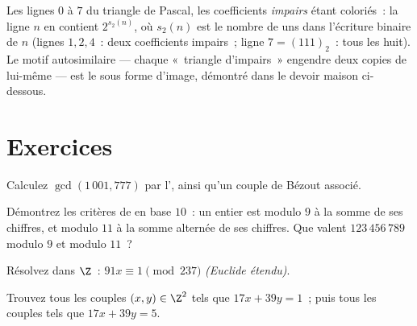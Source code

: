 \begin{omfigure}

{\small Les lignes $0$ à $7$ du triangle de Pascal, les coefficients
\emph{impairs} étant coloriés~: la ligne $n$ en contient $2^{s_2(n)}$, où
$s_2(n)$ est le nombre de uns dans l'écriture binaire de $n$
(lignes $1, 2, 4$~: deux coefficients impairs~; ligne $7 = (111)_2$~: tous les huit).
Le motif autosimilaire --- chaque «~triangle d'impairs~» engendre deux
copies de lui-même --- est le  sous forme d'image, démontré
dans le devoir maison ci-dessous.}
\end{omfigure}

\section{Exercices}

\begin{exercise}[$\star$]\label{exo:b1:arith:1}
Calculez $\gcd(1\,001, 777)$ par l', ainsi qu'un couple
de Bézout associé.
\end{exercise}

\begin{exercise}[$\star$]\label{exo:b1:arith:2}
Démontrez les critères de  en base $10$~: un entier est  modulo
$9$ à la somme de ses chiffres, et modulo $11$ à la somme alternée de
ses chiffres. Que valent $123\,456\,789$ modulo $9$ et modulo $11$~?
\end{exercise}

\begin{exercise}[$\star$]\label{exo:b1:arith:3}
Résolvez dans $\Z$~: $91x \equiv 1 \pmod{237}$ \emph{(Euclide étendu)}.
\end{exercise}

\begin{exercise}[$\star$]\label{exo:b1:arith:4}
Trouvez tous les couples $(x, y) \in \Z^2$ tels que $17x + 39y = 1$~; puis tous les couples
tels que $17 x + 39 y = 5$.
\end{exercise}

